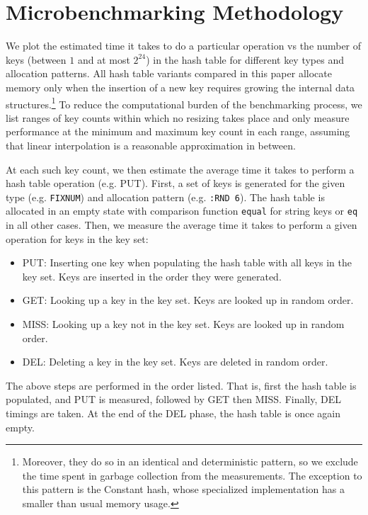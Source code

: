 \documentclass[sigconf]{acmart}
\newcommand*\lisp[1]{\texttt{#1}}
\renewcommand{\label}[1]{%
    \gdef\sfname{sf:##1}}%
\begin{document}
\section{Microbenchmarking Methodology}
\label{sec:microbenchmarking-methodology}

We plot the estimated time it takes to do a particular operation vs the number of keys (between $1$ and at most $2^{24}$) in the hash table for different key types and allocation patterns.
All hash table variants compared in this paper allocate memory only when the insertion of a new key requires growing the internal data structures.\footnote{Moreover, they do so in an identical and deterministic pattern, so we exclude the time spent in garbage collection from the measurements.
The exception to this pattern is the Constant hash, whose specialized implementation has a smaller than usual memory usage.}
To reduce the computational burden of the benchmarking process, we list ranges of key counts within which no resizing takes place and only measure performance at the minimum and maximum key count in each range, assuming that linear interpolation is a reasonable approximation in between.

At each such key count, we then estimate the average time it takes to perform a hash table operation (e.g. PUT).
First, a set of keys is generated for the given type (e.g. \texttt{FIXNUM}) and allocation pattern (e.g. \texttt{:RND 6}).
The hash table is allocated in an empty state with comparison function \lisp{equal} for string keys or \lisp{eq} in all other cases.
Then, we measure the average time it takes to perform a given operation for keys in the key set:
\begin{itemize}
\item{PUT}: Inserting one key when populating the hash table with all keys in the key set.
Keys are inserted in the order they were generated.
\item{GET}: Looking up a key in the key set.
Keys are looked up in random order.
\item{MISS}: Looking up a key not in the key set.
Keys are looked up in random order.
\item{DEL}: Deleting a key in the key set.
Keys are deleted in random order.
\end{itemize}
The above steps are performed in the order listed.
That is, first the hash table is populated, and PUT is measured, followed by GET then MISS.
Finally, DEL timings are taken.
At the end of the DEL phase, the hash table is once again empty.
\end{document}
